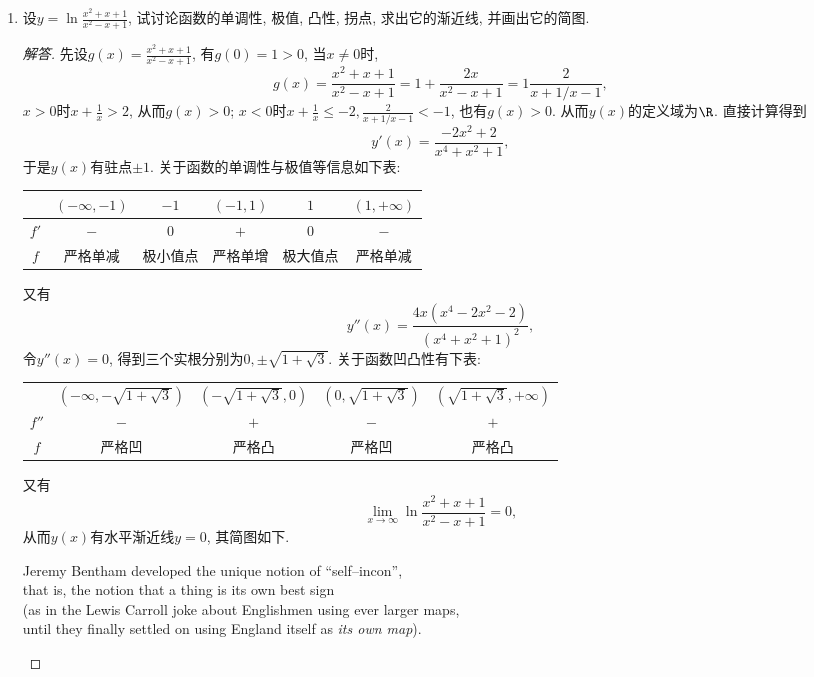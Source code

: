 \begin{4a}
\begin{enumerate}
\item 设\(y=\ln\frac{x^2+x+1}{x^2-x+1}\), 
试讨论函数的单调性, 极值, 凸性, 拐点, 求出它的渐近线, 并画出它的简图.
\begin{proof}[解答]
先设\(g(x)=\frac{x^2+x+1}{x^2-x+1}\), 有\(g(0)=1>0\), 当\(x\ne 0\)时, 
\[g(x)=\frac{x^2+x+1}{x^2-x+1}=1+\frac{2x}{x^2-x+1}=1\frac{2}{x+1/x-1},\]
\(x>0\)时\(x+\frac{1}{x}>2\), 从而\(g(x)>0\); 
\(x<0\)时\(x+\frac{1}{x}\leqslant -2,\frac{2}{x+1/x-1}<-1\), 也有\(g(x)>0\). 
从而\(y(x)\)的定义域为\(\R\). 直接计算得到\[y'(x)=\frac{-2x^2+2}{x^4+x^2+1},\]
于是\(y(x)\)有驻点\(\pm1\). 关于函数的单调性与极值等信息如下表:
\begin{center}
\begin{tabular}{c|c|c|c|c|c}
&\(\left(-\infty,-1\right)\)&\(-1\)&\(\left(-1,1\right)\)&\(1\)&\(\left(1,+\infty\right)\)\\\hline
\(f'\)&\(-\)&\(0\)&\(+\)&\(0\)&\(-\)\\
\(f\)&严格单减&极小值点&严格单增&极大值点&严格单减
\end{tabular}
\end{center}
又有\[y''(x)=\frac{4x(x^4-2x^2-2)}{(x^4+x^2+1)^2},\]
令\(y''(x)=0\), 得到三个实根分别为\(0,\pm\sqrt{1+\sqrt{3}}\). 关于函数凹凸性有下表:
\begin{center}
\begin{tabular}{c|c|c|c|c}
&\(\left(-\infty,-\sqrt{1+\sqrt{3}}\right)\)&\(\left(-\sqrt{1+\sqrt{3}},0\right)\)&\(\left(0,\sqrt{1+\sqrt{3}}\right)\)&\(\left(\sqrt{1+\sqrt{3}},+\infty\right)\)\\
\(f''\)&\(-\)&\(+\)&\(-\)&\(+\)\\
\(f\)&严格凹&严格凸&严格凹&严格凸
\end{tabular}
\end{center}
 又有\[\lim_{x\rightarrow\infty}\ln\frac{x^2+x+1}{x^2-x+1}=0,\]
 从而\(y(x)\)有水平渐近线\(y=0\), 其简图如下.
 \begin{center}
    Jeremy Bentham developed the unique notion of ``self--incon'',\\
    that is, the notion that a thing is its own best sign\\
    (as in the Lewis Carroll joke about Englishmen using ever larger maps,\\
    until they finally settled on using England itself as \textit{its own map}).
\end{center}
\end{proof}
\end{enumerate}
\end{4a}

